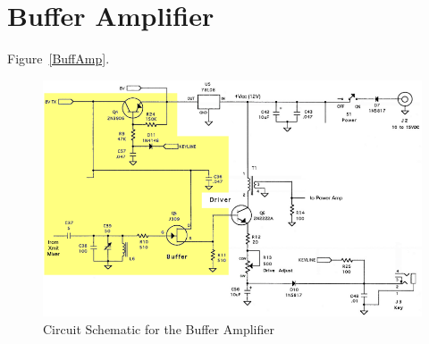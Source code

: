 \section{Buffer Amplifier}

Figure~\ref{BuffAmp}.

\begin{figure}[h!]
  \centering
  \includegraphics[scale=0.6]{./img/BuffAmp.png}

  \caption{Circuit Schematic for the Buffer Amplifier}
\end{figure}

